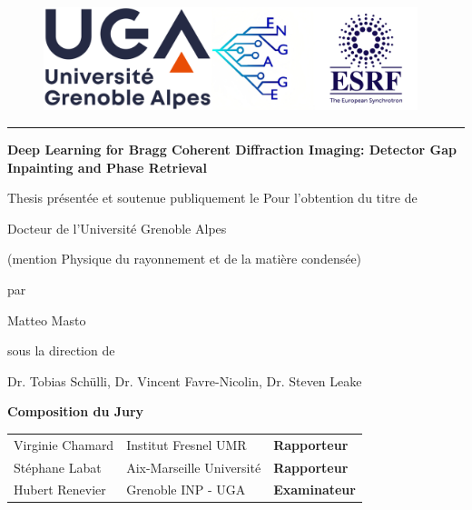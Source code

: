 \documentclass[12pt]{book}
\begin{document}
\begin{titlepage}
	
\begin{figure}
     \center
    \includegraphics[height=3cm]{figures/logos/full_logo.png}
\end{figure}
\hrule
		
\vfill

\begin{center}	
	{
        \Large \bfseries Deep Learning for Bragg Coherent Diffraction Imaging: Detector Gap Inpainting and Phase Retrieval
    }
\end{center}	
		
\vfill
\begin{center}	
	{\Huge  Thesis}
	\vfill
	présentée et soutenue publiquement le %
	\vfill
	Pour l'obtention du titre de 
	\vfill
	
	{\Large Docteur de l'Université Grenoble Alpes}
	
	(mention Physique du rayonnement et de la matière condensée)
	
	\vfill
	par 
	
	Matteo Masto
	
\vfill
sous la direction de 

Dr. Tobias Sch\"ulli, Dr. Vincent Favre-Nicolin, Dr. Steven Leake
	
\end{center}


\vspace{1cm}
			
{\bfseries Composition du Jury}		
\begin{center}
	\begin{tabular}{lll}

		
		Virginie Chamard &  Institut Fresnel UMR & \textbf{Rapporteur}\\
		
		Stéphane Labat  &  Aix-Marseille Université & \textbf{Rapporteur} \\
		
		Hubert Renevier & Grenoble INP - UGA   & \textbf{Examinateur} \\
		

\end{tabular}
\end{center}
\end{titlepage}
\end{document}
